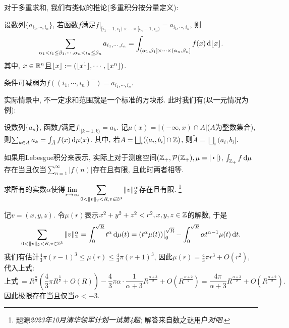 对于多重求和, 我们有类似的推论(多重积分按分量定义): 

\begin{corollary}{}
	设数列$\{ a_{i_1,\cdots ,i_n} \}$, 若函数$f$满足$f|_{[i_1-1,i_1) \times \cdots \times [i_n-1,i_n)}=a_{i_1,\cdots ,i_n}$, 则$$\sum_{\alpha _1 < i_1 \leq \beta _1 ,\cdots ,\alpha _n< i_n \leq \beta _n} a_{i_1,\cdots ,i_n} = \int_{(\alpha _1,\beta _1]\times \cdots \times (\alpha _n,\beta _n]} f(x) \mathop{}\!\mathrm{d} \lfloor x \rfloor.$$
	其中, $x \in \mathbb{R} ^n$且$\lfloor x \rfloor:=(\lfloor x^1 \rfloor,\cdots ,\lfloor x^n \rfloor)$. 
\end{corollary}
\begin{remark}
	条件可减弱为$f((i_1,\cdots ,i_n)^-)=a_{i_1,\cdots ,i_n}$. 
\end{remark}

实际情景中, 不一定求和范围就是一个标准的方块形. 此时我们有(以一元情况为例): 

\begin{corollary}{}
	设数列$\{ a_n \}$, 函数$f$满足$f|_{[k-1,k)}=a_k$. 记$\mu (x)=|(-\infty , x) \cap A|$($A$为整数集合), 则$\sum_{k \in A} a_k = \int_{\tilde{A}} f(x) \mathop{}\!\mathrm{d} \mu (x)$. 其中, 若$A = \bigsqcup_{i} ((a_i,b_i] \cap \mathbb{Z})$, 则$\tilde{A} = \bigsqcup_{i} (a_i,b_i]$. 
\end{corollary}

如果用Lebesgue积分来表示, 实际上对于测度空间$(\Z_+,\mathcal{P}(\Z_+),\mu=|\bigcdot|)$, $\int_{\mathbb{Z}_+} f \mathop{}\!\mathrm{d} \mu$存在当且仅当$\sum_{n=1}^{\infty} |f(n)|$存在且有限, 且此时两者相等. 

\begin{example}
	求所有的实数$\alpha$使得$\displaystyle \lim_{r \to \infty} \sum_{0<\| v \|_2 < R ,v \in \mathbb{Z} ^3} \| v \|_2 ^{\alpha}$存在且有限. \footnote{题源\textit{2023年10月清华领军计划一试第4题}; 解答来自数之谜用户\textit{对吧}. }
\end{example}
\begin{solution}
	记$v=(x,y,z)$. 令$\mu (r)$表示$x^2+y^2+z^2<r^2,x,y,z \in \mathbb{Z}$的解数, 于是$$\sum_{0<\| v \|_2 < R ,v \in \mathbb{Z} ^3} \| v \|_2 ^{\alpha} = \int_0^{\sqrt{R}} t^{\alpha} \mathop{}\!\mathrm{d} \mu (t) = (t^{\alpha} \mu (t))\big|_0^{\sqrt{R}} - \int_0^{\sqrt{R}} \alpha t^{\alpha -1} \mu (t) \mathop{}\!\mathrm{d} t.$$
	我们有估计$\frac{4}{3}\pi (r-1)^3 \leq \mu (r) \leq \frac{4}{3}\pi (r+1)^3$, 因此$\mu (r) = \frac{4}{3}\pi r^3+O(r^2)$, 代入上式: $$\textit{上式}~= R^{\frac{\alpha}{2}}\left( \frac{4}{3}\pi R^{\frac{3}{2}}+O(R) \right) - \frac{4}{3}\pi \alpha \cdot \frac{1}{\alpha +3} R^{\frac{\alpha +3}{2}} + O(R^{\frac{\alpha +2}{2}}) = \frac{4\pi}{\alpha +3} R^{\frac{\alpha +3}{2}} + O(R^{\frac{\alpha +2}{2}}).$$
	因此极限存在当且仅当$\alpha <-3$. 
\end{solution}

